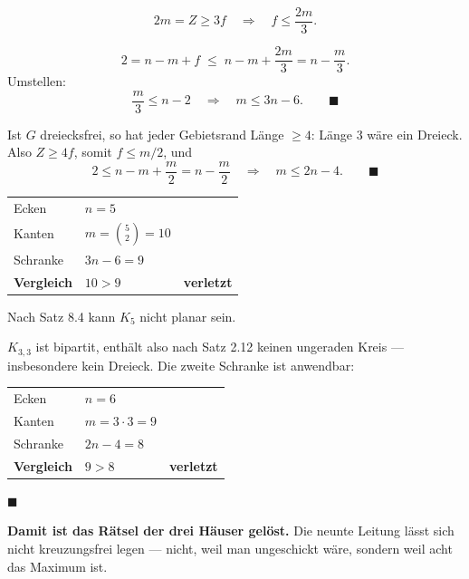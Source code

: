 \begin{merksatz}
\[ 2m = Z \ge 3f \quad\Longrightarrow\quad f \le \frac{2m}{3} . \]

\[ 2 = n - m + f \;\le\; n - m + \frac{2m}{3} = n - \frac{m}{3} . \]
Umstellen:
\[ \frac{m}{3} \le n - 2 \quad\Longrightarrow\quad m \le 3n - 6 . \qquad \blacksquare \]

Ist $G$ dreiecksfrei, so hat jeder Gebietsrand Länge $\ge 4$: Länge $3$ wäre ein Dreieck. Also $Z \ge 4f$, somit $f \le m/2$, und
\[ 2 \le n - m + \frac{m}{2} = n - \frac{m}{2} \quad\Longrightarrow\quad m \le 2n - 4 . \qquad \blacksquare \]
\end{merksatz}

\begin{merksatz}
\begin{center}
\renewcommand{\arraystretch}{1.45}
\begin{tabular}{@{}P{2.4cm}P{2.0cm}P{3.4cm}@{}}
\toprule
Ecken & $n = 5$ & \\
Kanten & $m = \binom{5}{2} = 10$ & \\
Schranke & $3n-6 = 9$ & \\
\midrule
\textbf{Vergleich} & $10 > 9$ & \textcolor{akzent}{\textbf{verletzt}}\\
\bottomrule
\end{tabular}
\end{center}
Nach Satz 8.4 kann $K_5$ nicht planar sein.

$K_{3,3}$ ist bipartit, enthält also nach Satz 2.12 keinen ungeraden Kreis --- insbesondere kein Dreieck. Die zweite Schranke ist anwendbar:
\begin{center}
\renewcommand{\arraystretch}{1.45}
\begin{tabular}{@{}P{2.4cm}P{2.0cm}P{3.4cm}@{}}
\toprule
Ecken & $n = 6$ & \\
Kanten & $m = 3 \cdot 3 = 9$ & \\
Schranke & $2n-4 = 8$ & \\
\midrule
\textbf{Vergleich} & $9 > 8$ & \textcolor{akzent}{\textbf{verletzt}}\\
\bottomrule
\end{tabular}
\end{center}
$\blacksquare$

\begin{center}
\begin{minipage}{0.9\textwidth}
\textbf{Damit ist das Rätsel der drei Häuser gelöst.} Die neunte Leitung lässt sich nicht kreuzungsfrei legen --- nicht, weil man ungeschickt wäre, sondern weil acht das Maximum ist.
\end{minipage}
\end{center}


\end{merksatz}
